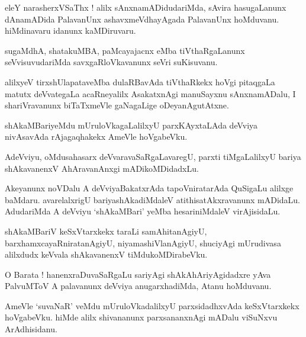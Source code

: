 \documentclass{article}
\begin{document}
\begin{mn}
eleY narasherxVSaThx ! alilx sAnxnamADidudariMda, sAvira hasugaLanunx dAnamADida PalavanUnx 
ashavxmeVdhayAgada PalavanUnx hoMduvanu. hiMdinavaru idanunx kaMDiruvaru.
\end{mn}

\begin{mn}
sugaMdhA, shatakuMBA, paMcayajacnx eMba tiVthaRgaLanunx seVvisuvudariMda savxgaRloVkavanunx seVri 
suKisuvanu.
\end{mn}

\begin{mn}
alilxyeV tirxshUlapataveMba dulaRBavAda tiVthaRkekx hoVgi pitaqgaLa matutx deVvategaLa 
acaRneyalilx AsakatxnAgi manuSayxnu sAnxnamADalu, I shariVravanunx biTaTxmeVle gaNagaLige 
oDeyanAgutAtxne.
\end{mn}

\begin{mn}
shAkaMBariyeMdu mUruloVkagaLalilxyU parxKAyxtaLAda deVviya nivAsavAda rAjagaqhakekx AmeVle 
hoVgabeVku.
\end{mn}

\begin{mn}
AdeVviyu, oMdusahasarx deVvaravaSaRgaLavaregU, parxti tiMgaLalilxyU bariya shAkavanenxV 
AhAravanAnxgi mADikoMDidadxLu.
\end{mn}

\begin{mn}
Akeyanunx noVDalu A deVviyaBakatxrAda tapoVniratarAda QuSigaLu alilxge baMdaru. avarelalxrigU
bariyashAkadiMdaleV atithisatAkxravanunx mADidaLu. AdudariMda A deVviyu `shAkaMBari' yeMba 
hesariniMdaleV virAjisidaLu.
\end{mn}

\begin{mn}
shAkaMBariV keSxVtarxkekx taraLi samAhitanAgiyU, barxhamxcayaRniratanAgiyU, niyamashiVlanAgiyU, 
shuciyAgi mUrudivasa alilxdudx keVvala shAkavanenxV tiMdukoMDirabeVku.
\end{mn}

\begin{mn}
O Barata ! hanenxraDuvaSaRgaLu sariyAgi shAkAhAriyAgidadxre yAva PalvuMToV A palavanunx deVviya 
anugarxhadiMda, Atanu hoMduvanu.
\end{mn}

\begin{mn}
AmeVle `suvaNaR' veMdu mUruloVkadalilxyU parxsidadhxvAda keSxVtarxkekx hoVgabeVku. hiMde alilx 
shivananunx parxsananxnAgi mADalu viSuNxvu ArAdhisidanu.
\end{mn}
\end{document}

